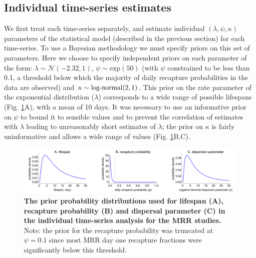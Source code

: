 \documentclass[12pt]{article}
\begin{document}
\subsection{Individual time-series estimates}\label{sec:MRR_individual_analysis}
We first treat each time-series separately, and estimate individual $(\lambda,\psi,\kappa)$ parameters of the statistical model (described in the previous section) for each time-series. To use a Bayesian methodology we must specify priors on this set of parameters. Here we choose to specify independent priors on each parameter of the form: $\lambda\sim \mathcal{N}(-2.32,1)$, $\psi\sim \text{exp}(50)$ (with $\psi$ constrained to be less than 0.1, a threshold below which the majority of daily recapture probabilities in the data are observed) and $\kappa\sim \textnormal{log-normal}(2,1)$. This prior on the rate parameter of the exponential distribution ($\lambda$) corresponds to a wide range of possible lifespans (Fig. \ref{fig:mrr_individualTimeSeries_priors}A), with a mean of 10 days. It was necessary to use an informative prior on $\psi$ to bound it to sensible values and to prevent the correlation of estimates with $\lambda$ leading to unreasonably short estimates of $\lambda$; the prior on $\kappa$ is fairly uninformative and allows a wide range of values (Fig. \ref{fig:mrr_individualTimeSeries_priors}B,C). 


\begin{figure}[h]
	\centerline{\includegraphics[width=1.25\textwidth]{./Figure_files/mrr_individualTimeSeries_priors.pdf}}
	\caption{\textbf{The prior probability distributions used for lifespan (A), recapture probability (B) and dispersal parameter (C) in the individual time-series analysis for the MRR studies.} Note: the prior for the recapture probability was truncated at $\psi=0.1$ since most MRR day one recapture fractions were significantly below this threshold.}
	\label{fig:mrr_individualTimeSeries_priors}
\end{figure}
\end{document}
